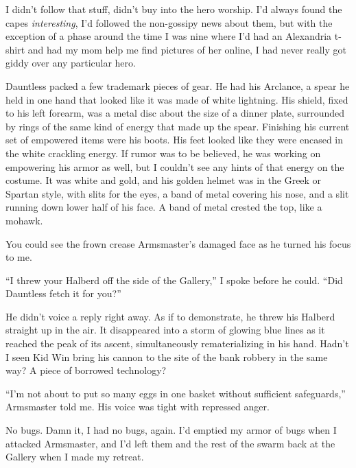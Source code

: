I didn't follow that stuff, didn't buy into the hero worship.  I'd always found the capes \emph{interesting}, I'd followed the non-gossipy news about them, but with the exception of a phase around the time I was nine where I'd had an Alexandria t-shirt and had my mom help me find pictures of her online, I had never really got giddy over any particular hero.



Dauntless packed a few trademark pieces of gear.  He had his Arclance, a spear he held in one hand that looked like it was made of white lightning.  His shield, fixed to his left forearm, was a metal disc about the size of a dinner plate, surrounded by rings of the same kind of energy that made up the spear.  Finishing his current set of empowered items were his boots.  His feet looked like they were encased in the white crackling energy.  If rumor was to be believed, he was working on empowering his armor as well, but I couldn't see any hints of that energy on the costume.  It was white and gold, and his golden helmet was in the Greek or Spartan style, with slits for the eyes, a band of metal covering his nose, and a slit running down lower half of his face.  A band of metal crested the top, like a mohawk.



You could see the frown crease Armsmaster's damaged face as he turned his focus to me.



``I threw your Halberd off the side of the Gallery,'' I spoke before he could.  ``Did Dauntless fetch it for you?''



He didn't voice a reply right away.  As if to demonstrate, he threw his Halberd straight up in the air.  It disappeared into a storm of glowing blue lines as it reached the peak of its ascent, simultaneously rematerializing in his hand.  Hadn't I seen Kid Win bring his cannon to the site of the bank robbery in the same way?  A piece of borrowed technology?



``I'm not about to put so many eggs in one basket without sufficient safeguards,'' Armsmaster told me.  His voice was tight with repressed anger.



No bugs.  Damn it, I had no bugs, again.  I'd emptied my armor of bugs when I attacked Armsmaster, and I'd left them and the rest of the swarm back at the Gallery when I made my retreat.



